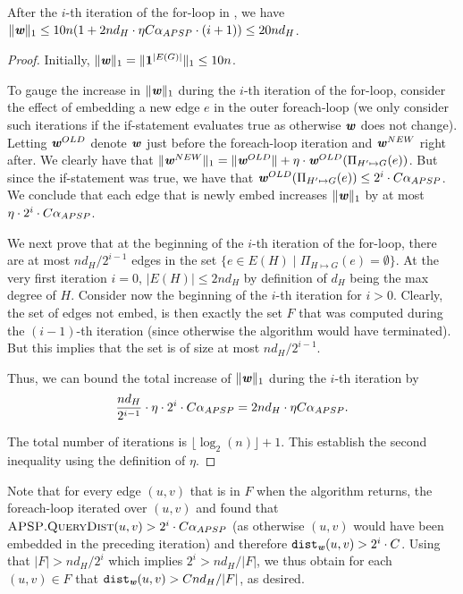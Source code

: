\begin{invariant}\label{inv:totalWeight}
After the $i$-th iteration of the for-loop in , we have $\|\boldsymbol{\mathit{w}}\|_1 \leq 10n (1 + 2n d_H \cdot \eta C\alpha_{APSP} \cdot (i+1)) \leq 20n d_H$.
\end{invariant}
\begin{proof}
Initially, $\|\boldsymbol{\mathit{w}}\|_1 = \|\mathbf{1}^{|E(G)|}\|_1 \leq 10n$.

To gauge the increase in $\|\boldsymbol{\mathit{w}}\|_1$ during the $i$-th iteration of the for-loop, consider the effect of embedding a new edge $e$ in the outer foreach-loop (we only consider such iterations if the if-statement evaluates true as otherwise $\boldsymbol{\mathit{w}}$ does not change). 
Letting $\boldsymbol{\mathit{w}}^{OLD}$ denote $\boldsymbol{\mathit{w}}$ just before the foreach-loop iteration and $\boldsymbol{\mathit{w}}^{NEW}$ right after.
We clearly have that $\|\boldsymbol{\mathit{w}}^{NEW}\|_1 = \|\boldsymbol{\mathit{w}}^{OLD}\| + \eta \cdot \boldsymbol{\mathit{w}}^{OLD}(\Pi_{H' \mapsto G}(e))$.
But since the if-statement was true, we have that $\boldsymbol{\mathit{w}}^{OLD}(\Pi_{H' \mapsto G}(e)) \leq 2^i \cdot C\alpha_{APSP}$.
We conclude that each edge that is newly embed increases $\|\boldsymbol{\mathit{w}}\|_1$ by at most $\eta \cdot 2^i \cdot C\alpha_{APSP}$.

We next prove that at the beginning of the $i$-th iteration of the for-loop, there are at most $n d_H/2^{i-1}$ edges in the set $\{ e \in  E(H) \;|\; \Pi_{H \mapsto G}(e) = \emptyset\}$.
At the very first iteration $i = 0$, $|E(H)| \le 2n d_H$ by definition of $d_H$ being the max degree of $H$. Consider now the beginning of the $i$-th iteration for $i > 0$. Clearly, the set of edges not embed, is then exactly the set $F$ that was computed during the $(i-1)$-th iteration (since otherwise the algorithm would have terminated). But this implies that the set is of size at most $n d_H / 2^{i-1}$. 

Thus, we can bound the total increase of $\|\boldsymbol{\mathit{w}}\|_1$ during the $i$-th iteration by 
\[\frac{n d_H}{2^{i-1}} \cdot \eta \cdot 2^i \cdot C\alpha_{APSP} = 2n d_H \cdot \eta C\alpha_{APSP}.\]

The total number of iterations is $\lfloor \log_2(n) \rfloor + 1.$ This establish the second inequality using the definition of $\eta$.
\end{proof}

Note that for every edge $(u,v)$ that is in $F$ when the algorithm returns, the foreach-loop iterated over $(u,v)$ and found that $\textsc{APSP}.\textsc{QueryDist}(u,v) > 2^i \cdot C\alpha_{APSP}$ (as otherwise $(u,v)$ would have been embedded in the preceding iteration) and therefore $\operatorname{\mathtt{dist}}_{\boldsymbol{\mathit{w}}}(u,v) > 2^i \cdot C$. Using that $|F| > n d_H/2^i$ which implies $2^i > n d_H/ |F|$, we thus obtain for each $(u,v) \in F$ that $\operatorname{\mathtt{dist}}_{\boldsymbol{\mathit{w}}}(u,v) > C n d_H/ |F|$, as desired.

